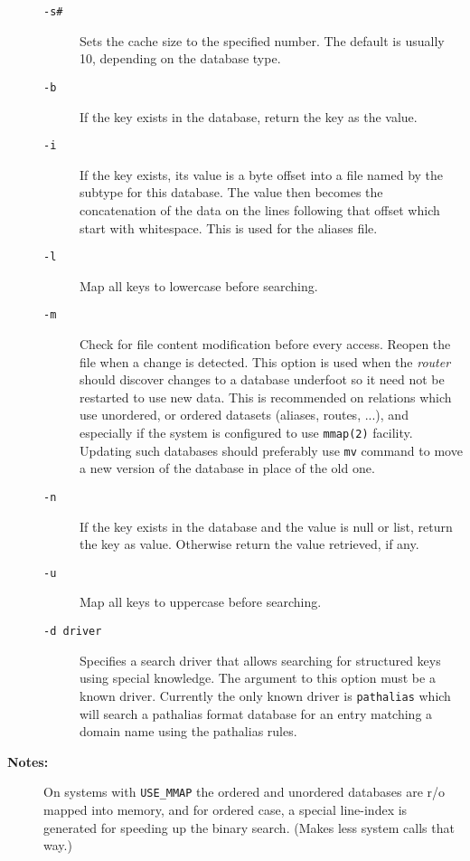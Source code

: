\begin{description}
\begin{description}
\item[{\tt -s\#}] \mbox{}

Sets the cache size to the specified number. 
The default is usually 10, depending on the database type. 

\item[{\tt -b}] \mbox{}

If the key exists in the database, return the key 
as the value. 

\item[{\tt -i}] \mbox{}

If the key exists, its value is a byte offset into 
a file named by the subtype for this database. The value then becomes 
the concatenation of the data on the lines following that offset which 
start with whitespace. This is used for the aliases file. 

\item[{\tt -l}] \mbox{}

Map all keys to lowercase before searching.

\item[{\tt -m}] \mbox{}

Check for file content modification before every 
access. Reopen the file when a change is detected. This option is 
used when the {\em router\/} should discover changes to a database
underfoot so it need not be restarted to use new data. This is 
recommended on relations which use unordered, or ordered datasets 
(aliases, routes, ...), and especially if the system is configured 
to use {\tt mmap(2)} facility. Updating such databases should 
preferably use {\tt mv} command to move a new version of the 
database in place of the old one. 

\item[{\tt -n}] \mbox{}

If the key exists in the database and the value is 
null or list, return the key as value. Otherwise return the value 
retrieved, if any. 

\item[{\tt -u}] \mbox{}

Map all keys to uppercase before searching. 

\item[{\tt -d driver}] \mbox{}

Specifies a search driver that allows
searching for structured keys using special knowledge. The 
argument to this option must be a known driver. Currently the 
only known driver is {\tt pathalias} which will search a
pathalias format database for an entry matching a domain name 
using the pathalias rules.

\end{description}


\item[{\bf Notes:}] \mbox{}

On systems with {\tt USE\_MMAP} the ordered 
and unordered databases are r/o mapped into memory, and for ordered 
case, a special line-index is generated for speeding up the binary 
search. (Makes less system calls that way.)

\end{description}


